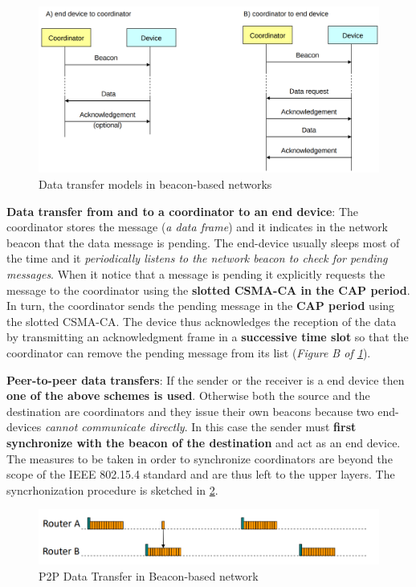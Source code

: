 \documentclass[10pt,a4paper]{report}
\theoremstyle{definition}
\begin{document}
\begin{figure}[h]
	\centering\includegraphics[scale=0.30]{images/Pasted image 20230417090745.png}
	\caption{Data transfer models in beacon-based networks}
	\label{beacon-enabled-models}
\end{figure}
\textbf{Data transfer from and to a coordinator to an end device}: The coordinator stores the message (\textit{a data frame}) and it indicates in the network beacon that the data message is pending. The end-device usually sleeps most of the time and it \textit{periodically listens to the network beacon to check for pending messages}.
When it notice that a message is pending it explicitly requests the message to the coordinator using the \textbf{slotted CSMA-CA in the CAP period}. In turn, the coordinator sends the pending message in the \textbf{CAP period} using the slotted CSMA-CA. The device thus acknowledges the reception of the data by transmitting an acknowledgment frame in a \textbf{successive time slot} so that the coordinator can remove the pending message from its list (\textit{Figure B of \ref{beacon-enabled-models}}).



\textbf{Peer-to-peer data transfers}: If the sender or the receiver is a end device then \textbf{one of the above schemes is used}. Otherwise both the source and the destination are coordinators and they issue their own beacons because two end-devices \textit{cannot communicate directly}. In this case the sender must \textbf{first synchronize with the beacon of the destination} and act as an end device. The measures to be taken in order to synchronize coordinators are beyond the scope of the IEEE 802.15.4 standard and are thus left to the upper layers. The syncrhonization procedure is sketched in \ref{p2p-beaconed-network}.
\begin{figure}[h]
	\centering\includegraphics[scale=0.50]{images/Pasted image 20230417091003.png}
	\caption{P2P Data Transfer in Beacon-based network}
	\label{p2p-beaconed-network}
\end{figure}
\end{document}
